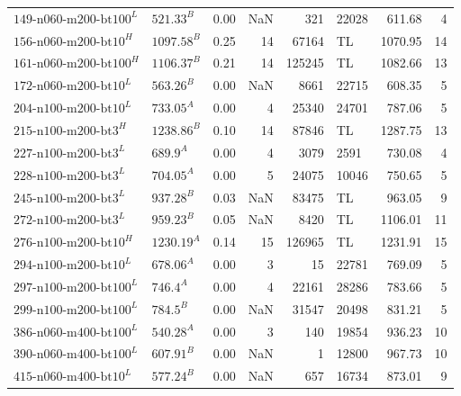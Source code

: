 \begin{table}[ht]
\begin{tabular}{llrrrlrr}
        $\text{149-n060-m200-bt100}^L$ & $\text{521.33}^B$  & 0.00 & NaN   & 321    & 22028 & 611.68  & 4     \\
        $\text{156-n060-m200-bt10}^H$  & $\text{1097.58}^B$ & 0.25 & 14    & 67164  & TL    & 1070.95 & 14    \\
        $\text{161-n060-m200-bt100}^H$ & $\text{1106.37}^B$ & 0.21 & 14    & 125245 & TL    & 1082.66 & 13    \\
        $\text{172-n060-m200-bt10}^L$  & $\text{563.26}^B$  & 0.00 & NaN   & 8661   & 22715 & 608.35  & 5     \\
        $\text{204-n100-m200-bt10}^L$  & $\text{733.05}^A$  & 0.00 & 4     & 25340  & 24701 & 787.06  & 5     \\
        $\text{215-n100-m200-bt3}^H$   & $\text{1238.86}^B$ & 0.10 & 14    & 87846  & TL    & 1287.75 & 13    \\
        $\text{227-n100-m200-bt3}^L$   & $\text{689.9}^A$   & 0.00 & 4     & 3079   & 2591  & 730.08  & 4     \\
        $\text{228-n100-m200-bt3}^L$   & $\text{704.05}^A$  & 0.00 & 5     & 24075  & 10046 & 750.65  & 5     \\
        $\text{245-n100-m200-bt3}^L$   & $\text{937.28}^B$  & 0.03 & NaN   & 83475  & TL    & 963.05  & 9     \\
        $\text{272-n100-m200-bt3}^L$   & $\text{959.23}^B$  & 0.05 & NaN   & 8420   & TL    & 1106.01 & 11    \\
        $\text{276-n100-m200-bt10}^H$  & $\text{1230.19}^A$ & 0.14 & 15    & 126965 & TL    & 1231.91 & 15    \\
        $\text{294-n100-m200-bt10}^L$  & $\text{678.06}^A$  & 0.00 & 3     & 15     & 22781 & 769.09  & 5     \\
        $\text{297-n100-m200-bt100}^L$ & $\text{746.4}^A$   & 0.00 & 4     & 22161  & 28286 & 783.66  & 5     \\
        $\text{299-n100-m200-bt100}^L$ & $\text{784.5}^B$   & 0.00 & NaN   & 31547  & 20498 & 831.21  & 5     \\
        $\text{386-n060-m400-bt100}^L$ & $\text{540.28}^A$  & 0.00 & 3     & 140    & 19854 & 936.23  & 10    \\
        $\text{390-n060-m400-bt100}^L$ & $\text{607.91}^B$  & 0.00 & NaN   & 1      & 12800 & 967.73  & 10    \\
        $\text{415-n060-m400-bt10}^L$  & $\text{577.24}^B$  & 0.00 & NaN   & 657    & 16734 & 873.01  & 9     \\

\end{tabular}
\end{table}
